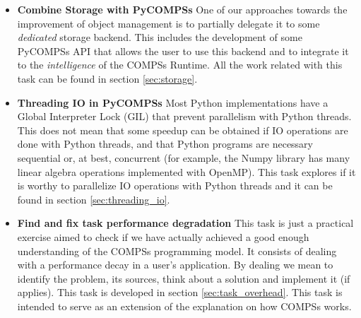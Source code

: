 \begin{itemize}
\item \textbf{Combine Storage with PyCOMPSs} One of our approaches towards the improvement of object management is to partially delegate it to some \textit{dedicated} storage backend. This includes the development of some PyCOMPSs API that allows the user to use this backend and to integrate it to the \textit{intelligence} of the COMPSs Runtime. All the work related with this task can be found in section \ref{sec:storage}.

\item \textbf{Threading IO in PyCOMPSs} Most Python implementations have a Global Interpreter Lock (GIL) that prevent parallelism with Python threads. This does not mean that some speedup can be obtained if IO operations are done with Python threads, and that Python programs are necessary sequential or, at best, concurrent (for example, the Numpy library has many linear algebra operations implemented with OpenMP). This task explores if it is worthy to parallelize IO operations with Python threads and it can be found in section \ref{sec:threading_io}.

\item \textbf{Find and fix task performance degradation} This task is just a practical exercise aimed to check if we have actually achieved a good enough understanding of the COMPSs programming model. It consists of dealing with a performance decay in a user's application. By dealing we mean to identify the problem, its sources, think about a solution and implement it (if applies). This task is developed in section \ref{sec:task_overhead}. This task is intended to serve as an extension of the explanation on how COMPSs works.

\end{itemize}

